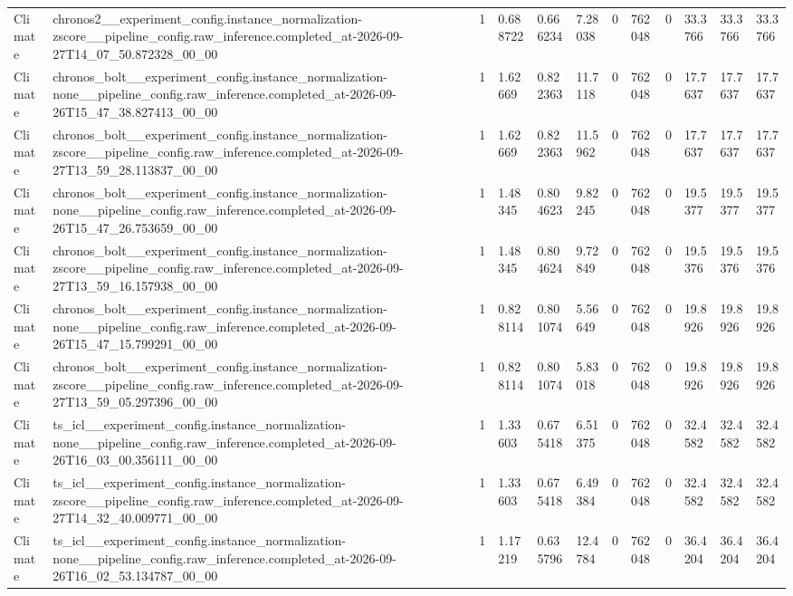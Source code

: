 \begin{tabular}{llllllllllll}
Climate & chronos2\_\_experiment\_config.instance\_normalization-zscore\_\_pipeline\_config.raw\_inference.completed\_at-2026-09-27T14\_07\_50.872328\_00\_00 & 1 & 0.688722 & 0.666234 & 7.28038 & 0 & 762048 & 0 & 33.3766 & 33.3766 & 33.3766 \\
Climate & chronos\_bolt\_\_experiment\_config.instance\_normalization-none\_\_pipeline\_config.raw\_inference.completed\_at-2026-09-26T15\_47\_38.827413\_00\_00 & 1 & 1.62669 & 0.822363 & 11.7118 & 0 & 762048 & 0 & 17.7637 & 17.7637 & 17.7637 \\
Climate & chronos\_bolt\_\_experiment\_config.instance\_normalization-zscore\_\_pipeline\_config.raw\_inference.completed\_at-2026-09-27T13\_59\_28.113837\_00\_00 & 1 & 1.62669 & 0.822363 & 11.5962 & 0 & 762048 & 0 & 17.7637 & 17.7637 & 17.7637 \\
Climate & chronos\_bolt\_\_experiment\_config.instance\_normalization-none\_\_pipeline\_config.raw\_inference.completed\_at-2026-09-26T15\_47\_26.753659\_00\_00 & 1 & 1.48345 & 0.804623 & 9.82245 & 0 & 762048 & 0 & 19.5377 & 19.5377 & 19.5377 \\
Climate & chronos\_bolt\_\_experiment\_config.instance\_normalization-zscore\_\_pipeline\_config.raw\_inference.completed\_at-2026-09-27T13\_59\_16.157938\_00\_00 & 1 & 1.48345 & 0.804624 & 9.72849 & 0 & 762048 & 0 & 19.5376 & 19.5376 & 19.5376 \\
Climate & chronos\_bolt\_\_experiment\_config.instance\_normalization-none\_\_pipeline\_config.raw\_inference.completed\_at-2026-09-26T15\_47\_15.799291\_00\_00 & 1 & 0.828114 & 0.801074 & 5.56649 & 0 & 762048 & 0 & 19.8926 & 19.8926 & 19.8926 \\
Climate & chronos\_bolt\_\_experiment\_config.instance\_normalization-zscore\_\_pipeline\_config.raw\_inference.completed\_at-2026-09-27T13\_59\_05.297396\_00\_00 & 1 & 0.828114 & 0.801074 & 5.83018 & 0 & 762048 & 0 & 19.8926 & 19.8926 & 19.8926 \\
Climate & ts\_icl\_\_experiment\_config.instance\_normalization-none\_\_pipeline\_config.raw\_inference.completed\_at-2026-09-26T16\_03\_00.356111\_00\_00 & 1 & 1.33603 & 0.675418 & 6.51375 & 0 & 762048 & 0 & 32.4582 & 32.4582 & 32.4582 \\
Climate & ts\_icl\_\_experiment\_config.instance\_normalization-zscore\_\_pipeline\_config.raw\_inference.completed\_at-2026-09-27T14\_32\_40.009771\_00\_00 & 1 & 1.33603 & 0.675418 & 6.49384 & 0 & 762048 & 0 & 32.4582 & 32.4582 & 32.4582 \\
Climate & ts\_icl\_\_experiment\_config.instance\_normalization-none\_\_pipeline\_config.raw\_inference.completed\_at-2026-09-26T16\_02\_53.134787\_00\_00 & 1 & 1.17219 & 0.635796 & 12.4784 & 0 & 762048 & 0 & 36.4204 & 36.4204 & 36.4204 \\

\end{tabular}
